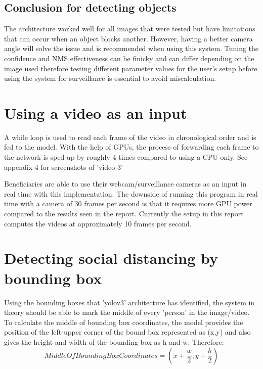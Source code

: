 \documentclass[12pt]{report}
\begin{document}
\subsection{Conclusion for detecting objects}

The architecture worked well for all images that were tested but have limitations that can occur when an object blocks another. However, having a better camera angle will solve the issue and is recommended when using this system. Tuning the confidence and NMS effectiveness can be finicky and can differ depending on the image used therefore testing different parameter values for the user's setup before using the system for surveillance is essential to avoid miscalculation.

\section{Using a video as an input}

A while loop is used to read each frame of the video in chronological order and is fed to the model. With the help of GPUs, the process of forwarding each frame to the network is sped up by roughly 4 times compared to using a CPU only. See appendix 4 for screenshots of 'video 3'

\vspace{2mm}

Beneficiaries are able to use their webcam/surveillance cameras as an input in real time with this implementation. The downside of running this program in real time with a camera of 30 frames per second is that it requires more GPU power compared to the results seen in the report. Currently the setup in this report computes the videos at approximately 10 frames per second. 

\section{Detecting social distancing by bounding box}

Using the bounding boxes that 'yolov3' architecture has identified, the system in theory should be able to mark the middle of every 'person' in the image/video. To calculate the middle of bounding box coordinates, the model provides the position of the left-upper corner of the bound box represented as (x,y) and also gives the height and width of the bounding box as h and w. Therefore:
\begin{equation*}
Middle Of Bounding Box Coordinates = (x+\frac{w}{2}, y+\frac{h}{2})
\end{equation*}
\end{document}
